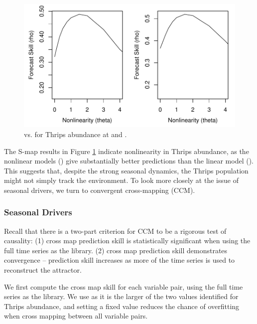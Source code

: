 \documentclass[article]{jss}
\begin{document}
\begin{figure}[t!]
\begin{center}
\includegraphics[width=6in]{article-thrips-smap}
\end{center}
\caption{\label{fig:thrips-smap}  vs.  for Thrips abundance at  and .}
\end{figure}

The S-map results in Figure \ref{fig:thrips-smap} indicate nonlinearity in Thrips abundance, as the nonlinear models () give substantially better predictions than the linear model (). This suggests that, despite the strong seasonal dynamics, the Thrips population might not simply track the environment. To look more closely at the issue of seasonal drivers, we turn to convergent cross-mapping (CCM).

\subsubsection{Seasonal Drivers}\label{sec:thrips-seasonal-drivers}

Recall that there is a two-part criterion for CCM to be a rigorous test of causality: (1) cross map prediction skill is statistically significant when using the full time series as the library. (2) cross map prediction skill demonstrates convergence -- prediction skill increases as more of the time series is used to reconstruct the attractor.

We first compute the cross map skill for each variable pair, using the full time series as the library. We use  as it is the larger of the two values identified for Thrips abundance, and setting a fixed value reduces the chance of overfitting when cross mapping between all variable pairs.
\end{document}
